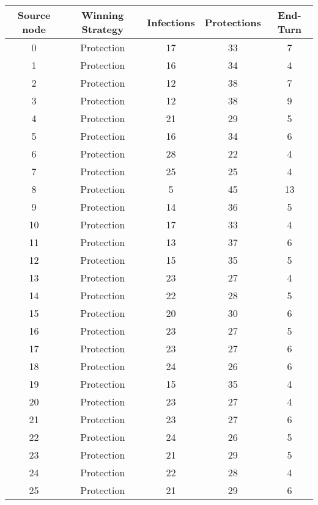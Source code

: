 \documentclass[results.tex]{subfiles}
\begin{document}
\begin{center}
  \begin{tabular}{| c || c | c | c | c |}
    \hline
    {\bfseries Source node} & {\bfseries Winning Strategy} & {\bfseries Infections} & {\bfseries Protections} & {\bfseries End-Turn} \\  %
    \hline\hline
    0 & Protection & 17 & 33 & 7 \\ 
    \hline
    1 & Protection & 16 & 34 & 4 \\ 
    \hline
    2 & Protection & 12 & 38 & 7 \\ 
    \hline
    3 & Protection & 12 & 38 & 9 \\ 
    \hline
    4 & Protection & 21 & 29 & 5 \\ 
    \hline
    5 & Protection & 16 & 34 & 6 \\ 
    \hline
    6 & Protection & 28 & 22 & 4 \\ 
    \hline
    7 & Protection & 25 & 25 & 4 \\ 
    \hline
    8 & Protection & 5 & 45 & 13 \\ 
    \hline
    9 & Protection & 14 & 36 & 5 \\ 
    \hline
    10 & Protection & 17 & 33 & 4 \\ 
    \hline
    11 & Protection & 13 & 37 & 6 \\ 
    \hline
    12 & Protection & 15 & 35 & 5 \\ 
    \hline
    13 & Protection & 23 & 27 & 4 \\ 
    \hline
    14 & Protection & 22 & 28 & 5 \\ 
    \hline
    15 & Protection & 20 & 30 & 6 \\ 
    \hline
    16 & Protection & 23 & 27 & 5 \\ 
    \hline
    17 & Protection & 23 & 27 & 6 \\ 
    \hline
    18 & Protection & 24 & 26 & 6 \\ 
    \hline
    19 & Protection & 15 & 35 & 4 \\ 
    \hline
    20 & Protection & 23 & 27 & 4 \\ 
    \hline
    21 & Protection & 23 & 27 & 6 \\ 
    \hline
    22 & Protection & 24 & 26 & 5 \\ 
    \hline
    23 & Protection & 21 & 29 & 5 \\ 
    \hline
    24 & Protection & 22 & 28 & 4 \\ 
    \hline
    25 & Protection & 21 & 29 & 6 \\ 

\end{tabular}
\end{center}
\end{document}
